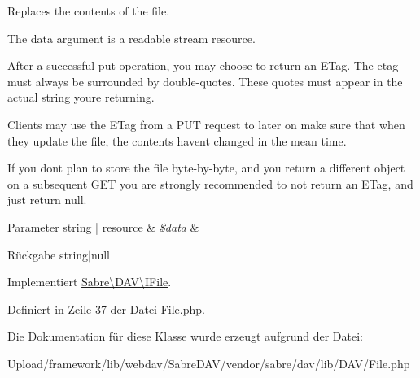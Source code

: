 Replaces the contents of the file.

The data argument is a readable stream resource.

After a successful put operation, you may choose to return an E\+Tag. The etag must always be surrounded by double-\/quotes. These quotes must appear in the actual string you\textquotesingle{}re returning.

Clients may use the E\+Tag from a P\+UT request to later on make sure that when they update the file, the contents haven\textquotesingle{}t changed in the mean time.

If you don\textquotesingle{}t plan to store the file byte-\/by-\/byte, and you return a different object on a subsequent G\+ET you are strongly recommended to not return an E\+Tag, and just return null.


\begin{DoxyParams}[1]{Parameter}
string | resource & {\em \$data} & \\
\hline
\end{DoxyParams}
\begin{DoxyReturn}{Rückgabe}
string$\vert$null 
\end{DoxyReturn}


Implementiert \mbox{\hyperlink{interface_sabre_1_1_d_a_v_1_1_i_file_a0c30bc87b22d289f311c854f23993452}{Sabre\textbackslash{}\+D\+A\+V\textbackslash{}\+I\+File}}.



Definiert in Zeile 37 der Datei File.\+php.



Die Dokumentation für diese Klasse wurde erzeugt aufgrund der Datei\+:\begin{DoxyCompactItemize}
\item 
Upload/framework/lib/webdav/\+Sabre\+D\+A\+V/vendor/sabre/dav/lib/\+D\+A\+V/File.\+php\end{DoxyCompactItemize}
